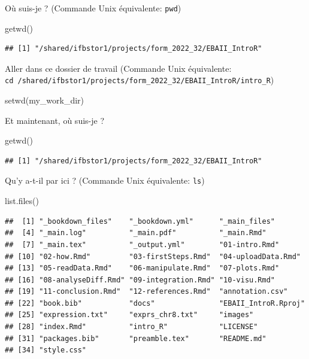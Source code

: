 \documentclass[
]{book}
\newenvironment{Shaded}{\begin{snugshade}}{\end{snugshade}}
\newcommand{\FunctionTok}[1]{\textcolor[rgb]{0.00,0.00,0.00}{#1}}
\newcommand{\NormalTok}[1]{#1}
\begin{document}
Où suis-je ? (Commande Unix équivalente: \texttt{pwd})

\begin{Shaded}
\begin{Highlighting}[]
\FunctionTok{getwd}\NormalTok{()}
\end{Highlighting}
\end{Shaded}

\begin{verbatim}
## [1] "/shared/ifbstor1/projects/form_2022_32/EBAII_IntroR"
\end{verbatim}

Aller dans ce dossier de travail (Commande Unix équivalente: \texttt{cd\ /shared/ifbstor1/projects/form\_2022\_32/EBAII\_IntroR/intro\_R})

\begin{Shaded}
\begin{Highlighting}[]
\FunctionTok{setwd}\NormalTok{(my\_work\_dir)}
\end{Highlighting}
\end{Shaded}

Et maintenant, où suis-je ?

\begin{Shaded}
\begin{Highlighting}[]
\FunctionTok{getwd}\NormalTok{()}
\end{Highlighting}
\end{Shaded}

\begin{verbatim}
## [1] "/shared/ifbstor1/projects/form_2022_32/EBAII_IntroR"
\end{verbatim}

Qu'y a-t-il par ici ? (Commande Unix équivalente: \texttt{ls})

\begin{Shaded}
\begin{Highlighting}[]
\FunctionTok{list.files}\NormalTok{()}
\end{Highlighting}
\end{Shaded}

\begin{verbatim}
##  [1] "_bookdown_files"    "_bookdown.yml"      "_main_files"       
##  [4] "_main.log"          "_main.pdf"          "_main.Rmd"         
##  [7] "_main.tex"          "_output.yml"        "01-intro.Rmd"      
## [10] "02-how.Rmd"         "03-firstSteps.Rmd"  "04-uploadData.Rmd" 
## [13] "05-readData.Rmd"    "06-manipulate.Rmd"  "07-plots.Rmd"      
## [16] "08-analyseDiff.Rmd" "09-integration.Rmd" "10-visu.Rmd"       
## [19] "11-conclusion.Rmd"  "12-references.Rmd"  "annotation.csv"    
## [22] "book.bib"           "docs"               "EBAII_IntroR.Rproj"
## [25] "expression.txt"     "exprs_chr8.txt"     "images"            
## [28] "index.Rmd"          "intro_R"            "LICENSE"           
## [31] "packages.bib"       "preamble.tex"       "README.md"         
## [34] "style.css"
\end{verbatim}
\end{document}

